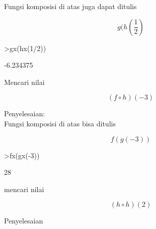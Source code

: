 \documentclass[a4paper,10pt]{article}
\begin{document}
\begin{eulernotebook}
\begin{eulercomment}
Fungsi komposisi di atas juga dapat ditulis\\
\end{eulercomment}
\begin{eulerformula}
\[
g(h(\frac{1}{2})
\]
\end{eulerformula}
\begin{eulerprompt}
>gx(hx(1/2))
\end{eulerprompt}
\begin{euleroutput}
  -6.234375
\end{euleroutput}
\begin{eulercomment}
Mencari nilai\\
\end{eulercomment}
\begin{eulerformula}
\[
(f \circ h)(-3)
\]
\end{eulerformula}
\begin{eulercomment}
Penyelesaian:\\
Fungsi komposisi di atas bisa ditulis\\
\end{eulercomment}
\begin{eulerformula}
\[
f(g(-3))
\]
\end{eulerformula}
\begin{eulerprompt}
>fx(gx(-3))
\end{eulerprompt}
\begin{euleroutput}
  28
\end{euleroutput}
\begin{eulercomment}
mencari nilai\\
\end{eulercomment}
\begin{eulerformula}
\[
(h \circ h)(2)
\]
\end{eulerformula}
\begin{eulercomment}
Penyelesaian


\end{eulercomment}
\end{eulernotebook}
\end{document}
